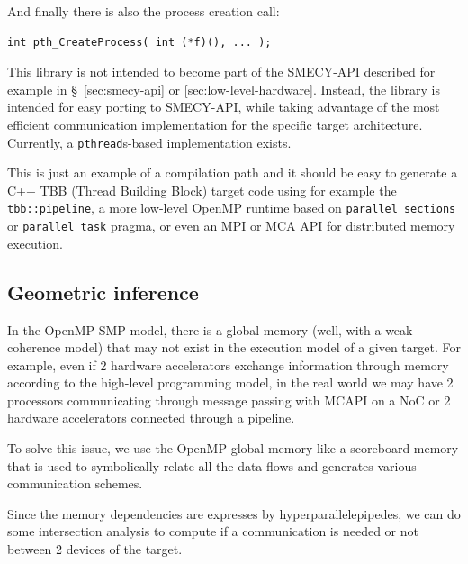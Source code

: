 \documentclass[a4paper]{article}
\begin{document}
And finally there is also the process creation call:
\begin{lstlisting}
int pth_CreateProcess( int (*f)(), ... );
\end{lstlisting}
This library is not intended to become part of the SMECY-API described for
example in \S~\ref{sec:smecy-api} or \ref{sec:low-level-hardware}.
Instead, the library is intended for easy porting to SMECY-API, while
taking advantage of the most efficient communication implementation for
the specific target architecture. Currently, a \texttt{pthread}s-based
implementation exists.

This is just an example of a compilation path and it should be easy to
generate a C++ TBB (Thread Building Block) target code using for example
the \verb|tbb::pipeline|, a more low-level OpenMP runtime based on
\texttt{parallel sections} or \texttt{parallel task} pragma, or even an
MPI or MCA API for distributed memory execution.


\subsection{Geometric inference}
\label{sec:geometric-inference}

In the OpenMP SMP model, there is a global memory (well, with a weak
coherence model) that may not exist in the execution model of a given
target. For example, even if 2 hardware accelerators exchange information
through memory according to the high-level programming model, in the real
world we may have 2 processors communicating through message passing with
MCAPI on a NoC or 2 hardware accelerators connected through a pipeline.

To solve this issue, we use the OpenMP global memory like a scoreboard
memory that is used to symbolically relate all the data flows and
generates various communication schemes.

Since the memory dependencies are expresses by hyperparallelepipedes, we
can do some intersection analysis to compute if a communication is needed
or not between 2 devices of the target.
\end{document}
